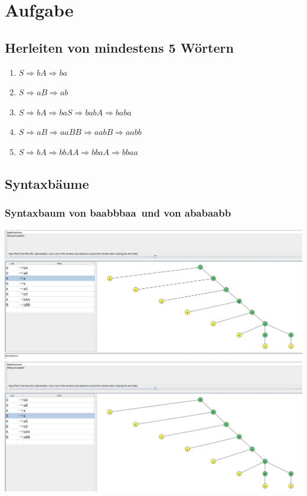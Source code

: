 \documentclass[a4paper,12pt,titlepage]{article}
\begin{document}
\section{Aufgabe}
\subsection{Herleiten von mindestens 5 Wörtern}
\begin{enumerate}
\item $S \Rightarrow bA \Rightarrow ba$
\item $S \Rightarrow aB \Rightarrow ab$
\item $S \Rightarrow bA \Rightarrow baS \Rightarrow babA \Rightarrow baba$
\item $S \Rightarrow aB \Rightarrow aaBB \Rightarrow aabB \Rightarrow aabb$
\item $S \Rightarrow bA \Rightarrow bbAA \Rightarrow bbaA \Rightarrow bbaa$
\end{enumerate}
\subsection{Syntaxbäume}
\subsubsection{Syntaxbaum von \glqq baabbbaa\grqq\, und von \glqq ababaabb\grqq}
\includegraphics[width=1.0\textwidth]{syntaxtree_task9_1.png}\\
\includegraphics[width=1.0\textwidth]{syntaxtree_task9_2.png}\\
\end{document}
